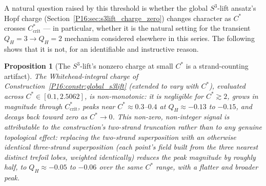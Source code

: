 \documentclass[11pt,a4paper]{article}
\newtheorem{proposition}[theorem]{Proposition}
\theoremstyle{definition}\newtheorem{definition}[theorem]{Definition}
\theoremstyle{remark}
\theoremstyle{definition}\newtheorem{construction}[theorem]{Construction}
\newcommand{\QH}{Q_H}
\begin{document}
A natural question raised by this threshold is whether the global
$S^3$-lift ansatz's Hopf charge (Section~\ref{P16:sec:s3lift_charge_zero})
changes character as $C^*$ crosses $C^*_{\mathrm{crit}}$ --- in
particular, whether it is the natural setting for the transient
$\QH=3\to\QH=2$ mechanism considered elsewhere in this series. The
following shows that it is not, for an identifiable and instructive
reason.

\begin{proposition}[The $S^3$-lift's nonzero charge at small $C^*$ is
  a strand-counting artifact]
\label{P16:prop:cstar_artifact}
The Whitehead-integral charge of Construction~\ref{P16:constr:global_s3lift}
(extended to vary with $C^*$), evaluated across
$C^*\in[0.1,2.5062]$, is non-monotonic: it is negligible for
$C^*\gtrsim2$, grows in magnitude through $C^*_{\mathrm{crit}}$, peaks
near $C^*\approx0.3$--$0.4$ at $\QH\approx-0.13$ to $-0.15$, and
decays back toward zero as $C^*\to0$. This non-zero, non-integer
signal is attributable to the construction's two-strand truncation
rather than to any genuine topological effect: replacing the
two-strand superposition with an otherwise identical three-strand
superposition (each point's field built from the three nearest
\emph{distinct} trefoil lobes, weighted identically) reduces the peak
magnitude by roughly half, to $\QH\approx-0.05$ to $-0.06$ over the
same $C^*$ range, with a flatter and broader peak.
\end{proposition}
\end{document}

